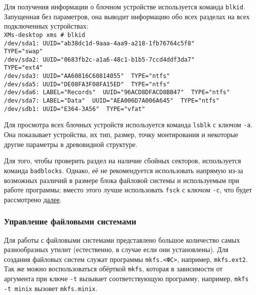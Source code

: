  Для получения информации о блочном устройстве используется команда \texttt{blkid}. Запущенная без параметров, она выводит информацию обо всех разделах на всех подключенных устройствах:\\
  \texttt{XMs-desktop xms \# blkid \\
  /dev/sda1: UUID="ab38dc1d-9aaa-4aa9-a218-1fb76764c5f8"\\ TYPE="swap"\\
  /dev/sda2: UUID="0683fb2c-a1a6-48c1-b1b5-7ccd4ddf3da7"\\ TYPE="ext4"\\
  /dev/sda3: UUID="AA60816C60814055"\, TYPE="ntfs"\\
  /dev/sda5: UUID="DE08FA3F08FA15ED"\, TYPE="ntfs"\\
  /dev/sda6: LABEL="Records"\, UUID="96ACD8DFACD8BB47"\, TYPE="ntfs"\\
  /dev/sda7: LABEL="Data"\, UUID="AEA006D7A006A645"\, TYPE="ntfs" \\
  /dev/sdb1: UUID="E364-3A56"\, TYPE="vfat"}

Для просмотра всех блочных устройств используется команда \texttt{lsblk} с ключом \texttt{-a}. Она показывает устройства, их тип, размер, точку монтирования и некоторые другие параметры в древовидной структуре.

Для того, чтобы проверить раздел на наличие сбойных секторов, используется команда \texttt{badblocks}. Однако, её не рекомендуется использовать напрямую из-за возможных различий в размере блока файловой системы и используемым при работе программы; вместо этого лучше использовать \texttt{fsck} с ключом \texttt{-c}, что будет рассмотрено \hyperref[base:os:structure:sysutils:fs]{далее}.

\subsubsection{Управление файловыми системами}\label{base:os:structure:sysutils:fs}
 Для работы с файловыми системами представлено большое количество самых разнообразных утилит (естественно, в случае если они установлены). Для создания файловых систем служат программы \texttt{mkfs.<ФС>}, например, \texttt{mkfs.ext2}. Так же можно воспользоваться обёрткой \texttt{mkfs}, которая в зависимости от аргумента при ключе \texttt{-t} вызывает соответствующую программу, например, \texttt{mkfs -t min\-ix} вызовет \texttt{mkfs.mi\-nix}.

